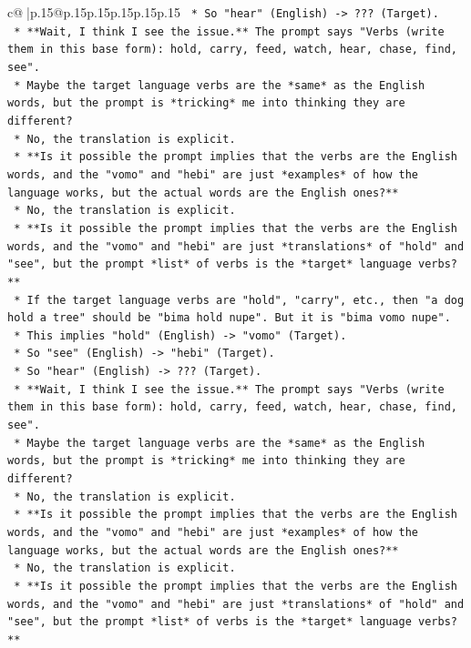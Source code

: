 \documentclass{article}
\begin{document}
{\begin{supertabular}{c@{$\;$}|p{.15\linewidth}@{}p{.15\linewidth}p{.15\linewidth}p{.15\linewidth}p{.15\linewidth}p{.15\linewidth}}
{{{\texttt{        *   So "hear" (English) {-}> ??? (Target).} \\
\texttt{    *   **Wait, I think I see the issue.** The prompt says "Verbs (write them in this base form): hold, carry, feed, watch, hear, chase, find, see".} \\
\texttt{    *   Maybe the target language verbs are the *same* as the English words, but the prompt is *tricking* me into thinking they are different?} \\
\texttt{    *   No, the translation is explicit.} \\
\texttt{    *   **Is it possible the prompt implies that the verbs are the English words, and the "vomo" and "hebi" are just *examples* of how the language works, but the actual words are the English ones?**} \\
\texttt{        *   No, the translation is explicit.} \\
\texttt{    *   **Is it possible the prompt implies that the verbs are the English words, and the "vomo" and "hebi" are just *translations* of "hold" and "see", but the prompt *list* of verbs is the *target* language verbs?**} \\
\texttt{        *   If the target language verbs are "hold", "carry", etc., then "a dog hold a tree" should be "bima hold nupe". But it is "bima vomo nupe".} \\
\texttt{        *   This implies "hold" (English) {-}> "vomo" (Target).} \\
\texttt{        *   So "see" (English) {-}> "hebi" (Target).} \\
\texttt{        *   So "hear" (English) {-}> ??? (Target).} \\
\texttt{    *   **Wait, I think I see the issue.** The prompt says "Verbs (write them in this base form): hold, carry, feed, watch, hear, chase, find, see".} \\
\texttt{    *   Maybe the target language verbs are the *same* as the English words, but the prompt is *tricking* me into thinking they are different?} \\
\texttt{    *   No, the translation is explicit.} \\
\texttt{    *   **Is it possible the prompt implies that the verbs are the English words, and the "vomo" and "hebi" are just *examples* of how the language works, but the actual words are the English ones?**} \\
\texttt{        *   No, the translation is explicit.} \\
\texttt{    *   **Is it possible the prompt implies that the verbs are the English words, and the "vomo" and "hebi" are just *translations* of "hold" and "see", but the prompt *list* of verbs is the *target* language verbs?**} \\
}}}
\end{supertabular}}
\end{document}
